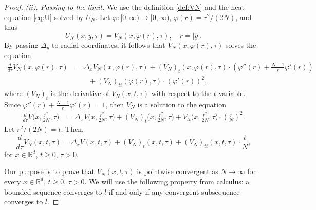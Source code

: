 \documentclass[11pt, twoside, notitlepage]{amsart}
\newcommand\R{\mathbb{R}}
\numberwithin{equation}{section}
\begin{document}
\begin{proof}
\noindent\emph{(ii). Passing to the limit.}  We use  the definition \eqref{def:VN} and the heat equation \eqref{eq:U} solved by $U_N$.
Let $\varphi:[0,\infty) \to [0,\infty)$,  $\varphi(r)=r^2/(2N)$, and thus
$$U_N(x,y,\tau) =V_N(x,\varphi(r),\tau), \quad  r=|y|.$$
By passing $\Delta_y$ to radial coordinates, it follows that $V_N(x,\varphi(r),\tau)$ solves the equation
\begin{align*}
\frac{d}{d\tau}V_N(x,\varphi(r),\tau)&=\Delta_{x} V_N(x,\varphi(r),\tau) +  (V_N)_t(x,\varphi(r),\tau) \cdot  \left(\varphi''(r) + \frac{N-1}{r} \varphi'(r)\right) \\
&\qquad+ (V_N)_{tt} (\varphi(r),\tau) \cdot (\varphi'(r))^2 ,
\end{align*}
where $(V_N)_t$ is the derivative of $V_N(x,t,\tau)$ with respect to the $t$ variable.
Since  $\varphi''(r) + \frac{N-1}{r} \varphi'(r)=1$, then  $V_N$ is a solution to the equation
\begin{align*}
\frac{d}{d\tau}V\big(x,\frac{r^2}{2N},\tau\big)&=\Delta_{x} V\big(x,\frac{r^2}{2N},\tau\big) +  (V_N)_t\big(x,\frac{r^2}{2N},\tau\big) + V_{tt} \big(x,\frac{r^2}{2N},\tau\big) \cdot \left(\frac{r}{N}\right)^2 .
\end{align*}
Let $r^2/(2N)=t$. Then,
\begin{equation}\label{eq:VN}
\frac{d}{d\tau}V_N(x,t,\tau)=\Delta_{x} V(x,t,\tau) +  (V_N)_t(x,t,\tau) + (V_N)_{tt} (x,t,\tau) \cdot \frac{t}{N},
\end{equation}
for $x\in \R^d$, $t\ge 0$, $\tau>0.$




Our purpose is to prove that $ V_N(x,t,\tau) $ is pointwise convergent as $N\to \infty$  for every $x\in \R^d$, $t\ge 0$, $\tau>0$.
We will use the following  property from calculus: a bounded sequence converges to $l$ if and only if any convergent subsequence converges to $l$.




\end{proof}
\end{document}
